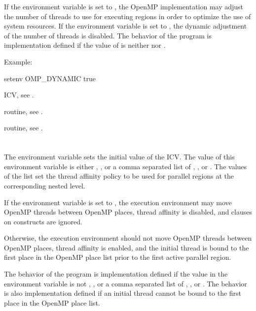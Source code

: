 If the environment variable is set to , the OpenMP implementation 
may adjust the number of threads to use for executing  regions 
in order to optimize the use of system resources. If the environment variable 
is set to , the dynamic adjustment of the number of threads is 
disabled. The behavior of the program is implementation defined if the value 
of  is neither  nor .

Example:
\begin{ompEnv}
setenv OMP_DYNAMIC true
\end{ompEnv}

\begin{crossrefs}
\item {} ICV, see .

\item {} routine, see .

\item {} routine, see .
\end{crossrefs}



\section{}
\label{sec:OMP_PROC_BIND}
The  environment variable sets the initial value of 
the  ICV. The value of this environment variable is either 
, , or a comma separated list of , 
, or . The values of the list set the thread 
affinity policy to be used for parallel regions at the corresponding nested level.

If the environment variable is set to , the execution 
environment may move OpenMP threads between OpenMP places, thread 
affinity is disabled, and  clauses on  
constructs are ignored.

Otherwise, the execution environment should not move OpenMP threads between
OpenMP places, thread affinity is enabled, and the initial thread is bound 
to the first place in the OpenMP place list prior to the first active 
parallel region.

The behavior of the program is implementation defined if the value in the
 environment variable is not , , 
or a comma separated list of , , or . 
The behavior is also implementation defined if an initial thread cannot be 
bound to the first place in the OpenMP place list. 

